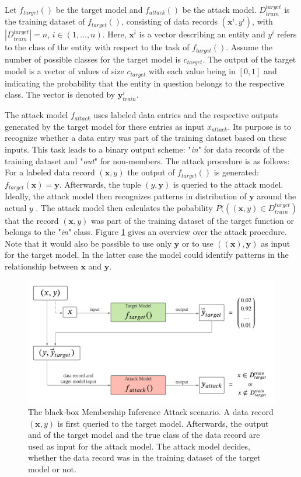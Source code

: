 \documentclass[runningheads]{llncs}
\begin{document}
Let $f_{target}()$ be the target model and $f_{attack}()$ be the attack model. $D_{train}^{target}$ is the training dataset of $f_{target}()$, consisting of data records $(\textbf{x}^{i},y^{i})$, with $|D_{train}^{target}| = n$, $i \in (1, \dots , n)$. Here, $\textbf{x}^{i}$ is a vector describing an entity and $y^{i}$ refers to the class of the entity with respect to the task of $f_{target}()$. Assume the number of possible classes for the target model is $c_{target}$. The output of the target model is a vector of values of size $c_{target}$ with each value being in $[0, 1]$ and indicating the probability that the entity in question belongs to the respective class. The vector is denoted by $\textbf{y}_{train}^{i}$.
\par
The attack model $f_{attack}$ uses labeled data entries and the respective outputs generated by the target model for these entries as input $x_{attack}$. Its purpose is to recognize whether a data entry was part of the training dataset based on these inputs. This task leads to a binary output scheme: "\textit{in}" for data records of the training dataset and "\textit{out}" for non-members.
The attack procedure is as follows: For a labeled data record $(\textbf{x}, y)$ the output of $f_{target}()$ is generated: $f_{target}(\textbf{x}) = \textbf{y}$. Afterwards, the tuple $(y, \textbf{y})$ is queried to the attack model. Ideally, the attack model then recognizes patterns in distribution of $\textbf{y}$ around the actual $y$ \cite{shokri2017membership}. The attack model then calculates the pobability $P(((\textbf{x}, y) \in D_{train}^{target})$ that the record $(\textbf{x}, y)$ was part of the training dataset of the target function or belongs to the "\textit{in}" class. Figure \ref{fig:attack} gives an overview over the attack procedure. Note that it would also be possible to use only $\textbf{y}$ or to use $((\textbf{x}), \textbf{y})$ as input for the target model. In the latter case the model could identify patterns in the relationship between $\textbf{x}$ and $\textbf{y}$.

\begin{figure}[ht]
    \centering
    \includegraphics[scale=0.1]{figures/mia-black-box-attack.png}
    \caption{The black-box Membership Inference Attack scenario. A data record $(\textbf{x}, y)$ is first queried to the target model. Afterwards, the output and of the target model and the true class of the data record are used as input for the attack model. The attack model decides, whether the data record was in the training dataset of the target model or not.}
    \label{fig:attack}
\end{figure}
\end{document}
